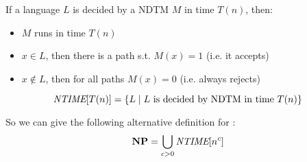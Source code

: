     If a language $L$ is decided by a NDTM $M$ in time $T(n)$, then:
    \begin{itemize}
        \item $M$ runs in time $T(n)$
        \item $x \in L$, then there is a path s.t. $M(x) = 1$ (i.e. it accepts)
        \item $x \not\in L$, then for all paths $M(x) = 0$ (i.e. always rejects)
    \end{itemize}


    \begin{definition}[\ntime]\label{def:ntime}
        \[ \textit{NTIME}[T(n)] = \{ L \; \vert \; L \text{ is decided by NDTM in time } T(n) \} \]
    \end{definition}

    So we can give the following alternative definition for \NP:
    \[ \textbf{NP} = \bigcup_{c > 0} \textit{NTIME}[n^c] \]

